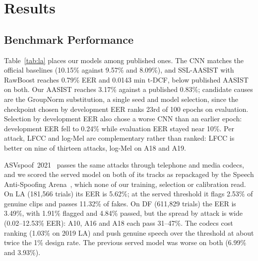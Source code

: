 \documentclass[journal]{IEEEtran}
\begin{document}
\section{Results}

\subsection{Benchmark Performance}
Table~\ref{tab:la} places our models among published ones. The CNN matches
the official baselines (10.15\% against 9.57\% and 8.09\%), and SSL-AASIST
with RawBoost reaches 0.79\% EER and 0.0143 min t-DCF, below published AASIST
on both. Our AASIST reaches 3.17\% against a published 0.83\%; candidate
causes are the GroupNorm substitution, a single seed and model selection,
since the checkpoint chosen by development EER ranks 23rd of 100 epochs on
evaluation. Selection by development EER also chose a worse CNN than an
earlier epoch: development EER fell to 0.24\% while evaluation EER stayed
near 10\%. Per attack, LFCC and log-Mel are complementary rather than ranked:
LFCC is better on nine of thirteen attacks, log-Mel on A18 and A19.

ASVspoof~2021~\cite{liu2023asvspoof2021} passes the same attacks through
telephone and media codecs, and we scored the served model on both of its
tracks as repackaged by the Speech Anti-Spoofing Arena~\cite{arena}, which
none of our training, selection or calibration read. On LA (181,566 trials)
its EER is 5.62\%; at the served threshold it flags 2.53\% of genuine
clips and passes 11.32\% of fakes. On DF (611,829 trials) the EER is
3.49\%, with 1.91\% flagged and 4.84\% passed, but the spread by attack
is wide (0.02--12.53\% EER): A10, A16 and A18 each pass 31--47\%. The
codecs cost ranking (1.03\% on 2019 LA) and push genuine speech over the
threshold at about twice the 1\% design rate. The previous served model was
worse on both (6.99\% and 3.93\%).
\end{document}
